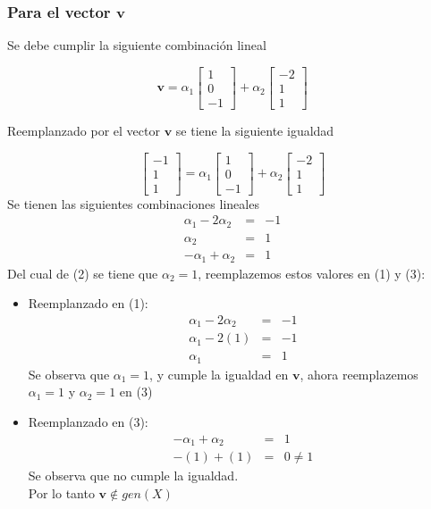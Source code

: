 \subsubsection{Para el vector $\mathbf{v}$}
Se debe cumplir la siguiente combinación lineal

\[
\mathbf{v} = {\alpha}_{1}
\begin{bmatrix}
1 \\ 
0 \\ 
-1
\end{bmatrix}
+ {\alpha}_{2}
\begin{bmatrix}
-2 \\ 
1 \\ 
1
\end{bmatrix}
\]

Reemplanzado por el vector $\mathbf{v}$ se tiene la siguiente igualdad

\[
\begin{bmatrix}
-1 \\ 
1 \\ 
1
\end{bmatrix}
= {\alpha}_{1}
\begin{bmatrix}
1 \\ 
0 \\ 
-1
\end{bmatrix}
+ {\alpha}_{2}
\begin{bmatrix}
-2 \\ 
1 \\ 
1
\end{bmatrix}
\]
\setcounter{equation}{0}
Se tienen las siguientes combinaciones lineales
\begin{eqnarray}
    {\alpha}_{1} - 2 {\alpha}_{2} &=& -1 \\
    {\alpha}_{2} &=& 1 \\
    -{\alpha}_{1} + {\alpha}_{2} &=& 1
\end{eqnarray}
Del cual de (2) se tiene que $\alpha_2 = 1$, reemplazemos estos valores en (1) y (3):
\begin{itemize}
     \item Reemplanzado en (1):
     \begin{eqnarray}
         {\alpha}_{1} - 2 {\alpha}_{2} &=& -1 \nonumber \\
         {\alpha}_{1} - 2 (1) &=& -1 \nonumber \\
         {\alpha}_{1} &=& 1 \nonumber
     \end{eqnarray}
     Se observa que ${\alpha}_{1} = 1$, y cumple la igualdad en $\mathbf{v}$, ahora reemplazemos ${\alpha}_{1} = 1$ y ${\alpha}_{2} = 1$ en (3) 
     \item Reemplanzado en (3):
     \begin{eqnarray}
         -{\alpha}_{1} + {\alpha}_{2} &=& 1 \nonumber \\
         -(1) + (1) &=& 0 \neq 1 \nonumber
     \end{eqnarray}
     Se observa que no cumple la igualdad.\\
     Por lo tanto $\mathbf{v} \notin gen(X)$
 \end{itemize} 

